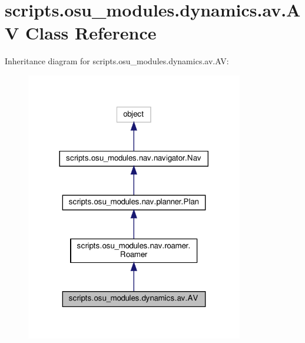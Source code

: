 \hypertarget{classscripts_1_1osu__modules_1_1dynamics_1_1av_1_1AV}{}\section{scripts.\+osu\+\_\+modules.\+dynamics.\+av.\+AV Class Reference}
\label{classscripts_1_1osu__modules_1_1dynamics_1_1av_1_1AV}


Inheritance diagram for scripts.\+osu\+\_\+modules.\+dynamics.\+av.\+AV\+:\nopagebreak
\begin{figure}[H]
\begin{center}
\leavevmode
\includegraphics[width=269pt]{d4/d15/classscripts_1_1osu__modules_1_1dynamics_1_1av_1_1AV__inherit__graph}
\end{center}
\end{figure}


